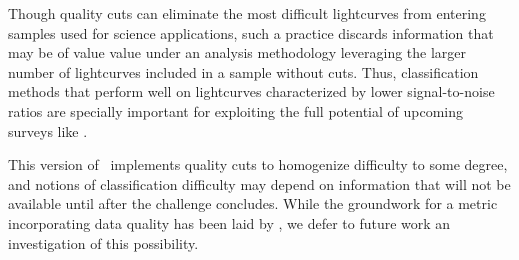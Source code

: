 Though quality cuts can eliminate the most difficult lightcurves from entering samples used for science applications, such a practice discards information that may be of value value under an analysis methodology leveraging the larger number of lightcurves included in a sample without cuts.
Thus, classification methods that perform well on lightcurves characterized by lower signal-to-noise ratios are specially important for exploiting the full potential of upcoming surveys like \lsst.

This version of \plasticc\ implements quality cuts to homogenize difficulty to some degree, and notions of classification difficulty may depend on information that will not be available until after the challenge concludes.
While the groundwork for a metric incorporating data quality has been laid by \citet{wu_radio_2018}, we defer to future work an investigation of this possibility.
